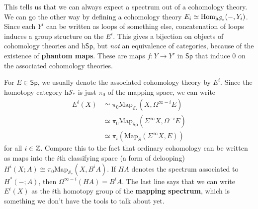 This tells us that we can always expect a spectrum out of a cohomology theory. We can go the other way by defining a cohomology theory $E_i  \simeq  \operatorname{Hom} _{\mathrm{h}\mathcal{S} _*}(-,Y_i )$. Since each $Y^i $ can be written as loops of something else, concatenation of loops induces a group structure on the $E^i $. This gives a bijection on objects of cohomology theories and $\mathrm{h}\mathsf{Sp} $, but \emph{not} an equivalence of categories, because of the existence of \textbf{phantom maps}. These are maps $f \colon Y \to Y'$ in $\mathsf{Sp} $ that induce 0 on the associated cohomology theories.

For $E \in \mathsf{Sp} $, we usually denote the associated cohomology theory by $E^i $. Since the homotopy category $\mathrm{h}\mathcal{S} _*$ is just $\pi_0$ of the mapping space, we can write 
\begin{align*}
    E^i (X) &\simeq \pi_0 \mathrm{Map}_{\mathcal{S} _*}(X, \Omega ^{ \infty-i}E)\\
    &\simeq  \pi_0 \mathrm{Map}_{\mathsf{Sp} }(\Sigma ^{\infty}X, \Omega ^{-i}E)\\
    &\simeq \pi_i (\mathrm{Map}_S (\Sigma ^{\infty}X,E))
\end{align*}for all $i \in \mathbb{Z}$. Compare this to the fact that ordinary cohomology can be written as maps into the $i$th classifying space (a form of delooping) $H^i (X;A) \cong \pi_0 \mathrm{Map}_{\mathcal{S} _*}(X,B^i A)$. If $HA$ denotes the spectrum associated to $H^*(-;A)$, then $\Omega ^{\infty-i}(HA)=B^i A$. The last line says that we can write $E^i (X)$ as the $i$th homotopy group of the \textbf{mapping spectrum}, which is something we don't have the tools to talk about yet.

\orbreak

